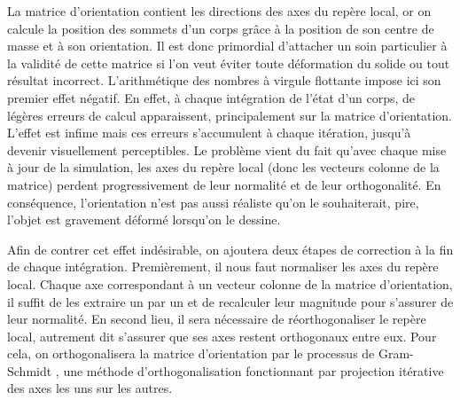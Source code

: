 La matrice d'orientation contient les directions des axes du repère
local, or on calcule la position des sommets d'un corps grâce à la
position de son centre de masse et à son orientation. Il est donc
primordial d'attacher un soin particulier à la validité de cette
matrice si l'on veut éviter toute déformation du solide ou tout
résultat incorrect. L'arithmétique des nombres à virgule flottante
impose ici son premier effet négatif. En effet, à chaque intégration
de l'état d'un corps, de légères erreurs de calcul apparaissent,
principalement sur la matrice d'orientation. L'effet est infime mais
ces erreurs s'accumulent à chaque itération, jusqu'à devenir
visuellement perceptibles. Le problème vient du fait qu'avec chaque
mise à jour de la simulation, les axes du repère local (donc les
vecteurs colonne de la matrice) perdent progressivement de leur
normalité et de leur orthogonalité. En conséquence, l'orientation
n'est pas aussi réaliste qu'on le souhaiterait, pire, l'objet est
gravement déformé lorsqu'on le dessine.

Afin de contrer cet effet indésirable, on ajoutera deux étapes de
correction à la fin de chaque intégration. Premièrement, il nous faut
normaliser les axes du repère local. Chaque axe correspondant à un
vecteur colonne de la matrice d'orientation, il suffit de les extraire
un par un et de recalculer leur magnitude pour s'assurer de leur
normalité. En second lieu, il sera nécessaire de réorthogonaliser le
repère local, autrement dit s'assurer que ses axes restent orthogonaux
entre eux. Pour cela, on orthogonalisera la matrice d'orientation par
le processus de Gram-Schmidt \cite{weber}, une méthode
d'orthogonalisation fonctionnant par projection itérative des axes les
uns sur les autres.

